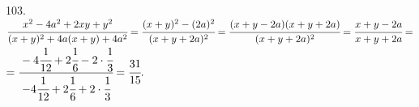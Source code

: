 103. $\cfrac{x^2-4a^2+2xy+y^2}{(x+y)^2+4a(x+y)+4a^2}=\cfrac{(x+y)^2-(2a)^2}{(x+y+2a)^2}=\cfrac{(x+y-2a)(x+y+2a)}{(x+y+2a)^2}=\cfrac{x+y-2a}{x+y+2a}=$\\$=
\cfrac{-4\cfrac{1}{12}+2\cfrac{1}{6}-2\cdot\cfrac{1}{3}}{-4\cfrac{1}{12}+2\cfrac{1}{6}+2\cdot\cfrac{1}{3}}=\cfrac{31}{15}.$\\
